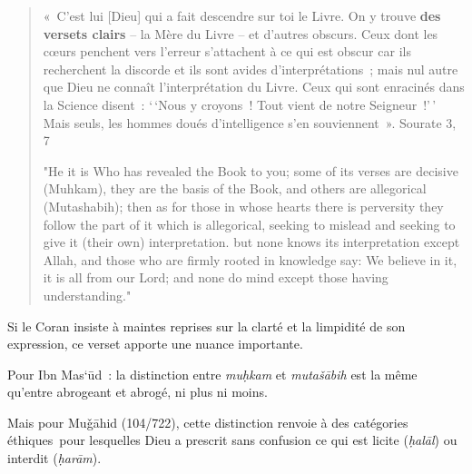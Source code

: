 \begin{quote}
«~C'est lui {[}Dieu{]} qui a fait descendre sur toi le Livre. On y
trouve \textbf{des versets clairs} -- la Mère du Livre -- et d'autres
obscurs. Ceux dont les cœurs penchent vers l'erreur s'attachent à ce qui
est obscur car ils recherchent la discorde et ils sont avides
d'interprétations~; mais nul autre que Dieu ne connaît l'interprétation
du Livre. Ceux qui sont enracinés dans la Science disent~: `\,`Nous y
croyons~! Tout vient de notre Seigneur~!'\,' Mais seuls, les hommes
doués d'intelligence s'en souviennent~». Sourate 3, 7



"He it is Who has revealed the Book to you; some of its verses are
decisive (Muhkam), they are the basis of the Book, and others are
allegorical (Mutashabih); then as for those in whose hearts there is
perversity they follow the part of it which is allegorical, seeking to
mislead and seeking to give it (their own) interpretation. but none
knows its interpretation except Allah, and those who are firmly rooted
in knowledge say: We believe in it, it is all from our Lord; and none do
mind except those having understanding."
\end{quote}

Si le Coran insiste à maintes reprises sur la clarté et la limpidité de
son expression, ce verset apporte une nuance importante.

Pour Ibn Mas`ūd~: la distinction entre \emph{muḥkam} et \emph{mutašābih}
est la même qu'entre abrogeant et abrogé, ni plus ni moins.

Mais pour Muǧāhid (104/722), cette distinction renvoie à des catégories
éthiques~pour lesquelles Dieu a prescrit sans confusion ce qui est
licite (\emph{ḥalāl}) ou interdit (\emph{ḥarām}).

